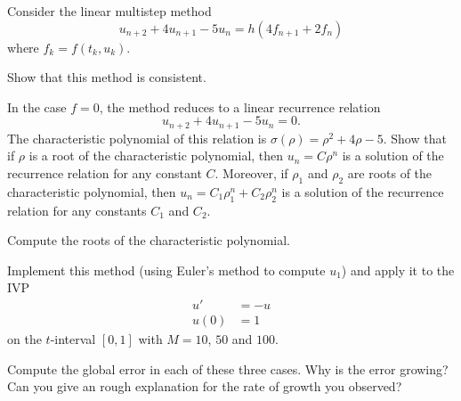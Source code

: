\documentclass[minion]{homework}
\begin{document}
\begin{problems}
\problem Consider the linear multistep method
\[
u_{n+2} +4 u_{n+1} -5u_{n} = h(4f_{n+1}+2f_n)
\]
where $f_k=f(t_k,u_k)$. 
\begin{subproblems}
\item Show that this method is consistent.
\item In the case $f=0$, the method reduces to
a linear recurrence relation
\[
u_{n+2} +4 u_{n+1} -5u_{n} = 0.
\]
The characteristic polynomial of this relation is
$\sigma(\rho) = \rho^2+4\rho -5$.  Show that if
$\rho$ is a root of the characteristic polynomial, then
$u_n = C\rho^n$ is a solution of the recurrence relation
for any constant $C$. Moreover, if $\rho_1$ and $\rho_2$
are roots of the characteristic polynomial, then
$u_n=C_1\rho_1^n + C_2\rho_2^n$ is a solution of the
recurrence relation for any constants $C_1$ and $C_2$.
\item Compute the roots of the characteristic polynomial.
\item Implement this method (using Euler's method 
to compute $u_1$) and apply it to the IVP
\begin{align*}
u'&=-u\\
u(0)&=1
\end{align*}
on the $t$-interval $[0,1]$ with $M=10$, $50$ and $100$.
\item Compute the global error in each of these three cases.
Why is the error growing?  Can you give an rough explanation
for the rate of growth you observed?
\end{subproblems}


\end{problems}
\end{document}
